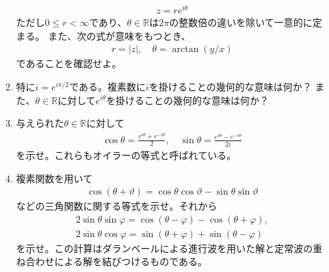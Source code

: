 \documentclass{jreport}
\begin{document}
\begin{enumerate}[label=\textbf{\arabic*.}]
\begin{enumerate}
\begin{align}
z=re^{i\theta}
\end{align}
ただし$0\leq r<\infty$であり、$\theta\in\mathbb{R}$は$2\pi$の整数倍の違いを除いて一意的に定まる。
また、次の式が意味をもつとき、
\begin{align}
r=|z|,\quad\theta=\arctan(y/x)
\end{align}
であることを確認せよ。
\item 特に$i=e^{i\pi/2}$である。複素数に$i$を掛けることの幾何的な意味は何か？
また、$\theta\in\mathbb{R}$に対して$e^{i\theta}$を掛けることの幾何的な意味は何か？
\item 与えられた$\theta\in\mathbb{R}$に対して
\begin{align}
\cos\theta=\frac{e^{i\theta}+e^{-i\theta}}{2},\quad\sin\theta=\frac{e^{i\theta}-e^{-i\theta}}{2i}
\end{align}
を示せ。これらもオイラーの等式と呼ばれている。
\item 複素関数を用いて
\begin{align}
\cos(\theta+\vartheta)=\cos\theta\cos\vartheta-\sin\theta\sin\vartheta
\end{align}
などの三角関数に関する等式を示せ。それから
\begin{align}
2\sin\theta\sin\varphi=\cos(\theta-\varphi)-\cos(\theta+\varphi),\\
2\sin\theta\cos\varphi=\sin(\theta+\varphi)+\sin(\theta-\varphi)
\end{align}
を示せ。この計算はダランベールによる進行波を用いた解と定常波の重ね合わせによる解を結びつけるものである。
\end{enumerate}
\end{enumerate}
\end{document}
